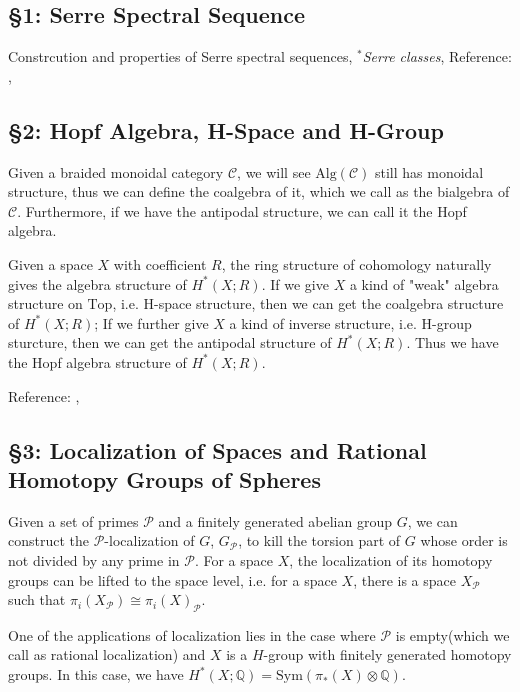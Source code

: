 \documentclass[12pt, reqno]{amsart}
\theoremstyle{definition}
\theoremstyle{remark}
\numberwithin{equation}{section}
\begin{document}
{\subsection*{\textbf{§1: Serre Spectral Sequence}}

Constrcution and properties of Serre spectral sequences, \emph{$^*$Serre classes}, 
Reference: \cite{HatSS}, \cite{May11}

\subsection*{\textbf{§2: Hopf Algebra, H-Space and H-Group}}

Given a braided monoidal category $\mathcal{C}$, we will see $\mathrm{Alg}(\mathcal{C})$ still has monoidal structure, thus we can define the coalgebra of it, which we call as the bialgebra of $\mathcal{C}$. Furthermore, if we have the antipodal structure, we can call it the Hopf algebra.

Given a space $X$ with coefficient $R$, the ring structure of cohomology naturally gives the algebra structure of $H^*(X; R)$. If we give $X$ a kind of "weak" algebra structure on $\mathrm{Top}$, i.e. H-space structure, then we can get the coalgebra structure of $H^*(X; R)$; If we further give $X$ a kind of inverse structure, i.e. H-group sturcture, then we can get the antipodal structure of $H^*(X; R)$. Thus we have the Hopf algebra structure of $H^*(X; R)$.

Reference: \cite{OAMM}, \cite{Hat02}

\subsection*{\textbf{§3: Localization of Spaces and Rational Homotopy Groups of Spheres}}

Given a set of primes $\mathcal{P}$ and a finitely generated abelian group $G$, we can construct the $\mathcal{P}$-localization of $G$, $G_{\mathcal{P}}$, to kill the torsion part of $G$ whose order is not divided by any prime in $\mathcal{P}$. For a space $X$, the localization of its homotopy groups can be lifted to the space level, i.e. for a space $X$, there is a space $X_{\mathcal{P}}$ such that $\pi_i(X_{\mathcal{P}}) \cong \pi_i(X)_{\mathcal{P}}$. 

One of the applications of localization lies in the case where $\mathcal{P}$ is empty(which we call as rational localization) and $X$ is a $H$-group with finitely generated homotopy groups. In this case, we have $H^*(X; \mathbb{Q}) = \mathrm{Sym}(\pi_*(X) \otimes \mathbb{Q})$.

}
\end{document}
